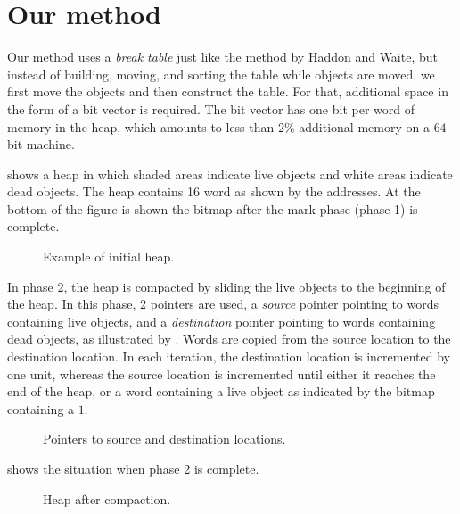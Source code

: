 \section{Our method}

Our method uses a \emph{break table} just like the method by Haddon
and Waite, but instead of building, moving, and sorting the table
while objects are moved, we first move the objects and then
construct the table.  For that, additional space in the form of a bit
vector is required.  The bit vector has one bit per word of memory in
the heap, which amounts to less than $2$\% additional memory on a
$64$-bit machine. 

 shows a heap in which shaded areas indicate
live objects and white areas indicate dead objects.  The heap contains
16 word as shown by the addresses.  At the bottom of the figure is
shown the bitmap after the mark phase (phase 1) is complete.

\begin{figure}
\begin{center}
\end{center}
\caption{\label{fig-example-a}
Example of initial heap.}
\end{figure}

In phase 2, the heap is compacted by sliding the live objects to the
beginning of the heap.  In this phase, 2 pointers are used, a
\emph{source} pointer pointing to words containing live objects, and a
\emph{destination} pointer pointing to words containing dead objects,
as illustrated by .  Words are copied from the
source location to the destination location.  In each iteration, the
destination location is incremented by one unit, whereas the source
location is incremented until either it reaches the end of the heap,
or a word containing a live object as indicated by the bitmap
containing a $1$.

\begin{figure}
\begin{center}
\end{center}
\caption{\label{fig-example-b}
Pointers to source and destination locations.}
\end{figure}

 shows the situation when phase 2 is complete. 

\begin{figure}
\begin{center}
\end{center}
\caption{\label{fig-example-c}
Heap after compaction.}
\end{figure}


